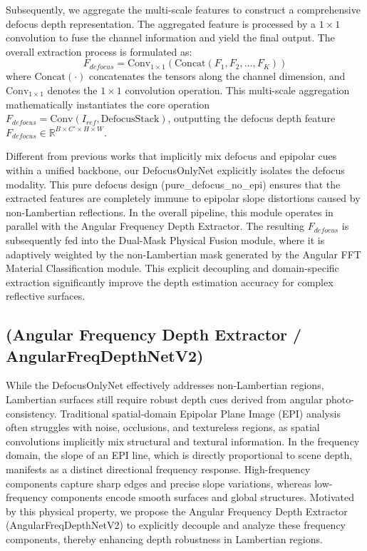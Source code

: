 Subsequently, we aggregate the multi-scale features to construct a comprehensive defocus depth representation. The aggregated feature is processed by a $1 \times 1$ convolution to fuse the channel information and yield the final output. The overall extraction process is formulated as:
\begin{equation}
\label{eq:eq19}
F_{defocus} = \text{Conv}_{1 \times 1}(\text{Concat}(F_1, F_2, \dots, F_K))
\end{equation}
where $\text{Concat}(\cdot)$ concatenates the tensors along the channel dimension, and $\text{Conv}_{1 \times 1}$ denotes the $1 \times 1$ convolution operation. This multi-scale aggregation mathematically instantiates the core operation $F_{defocus} = \text{Conv}(I_{ref}, \text{DefocusStack})$, outputting the defocus depth feature $F_{defocus} \in \mathbb{R}^{B \times C' \times H \times W}$.

Different from previous works that implicitly mix defocus and epipolar cues within a unified backbone, our DefocusOnlyNet explicitly isolates the defocus modality. This pure defocus design (pure_defocus_no_epi) ensures that the extracted features are completely immune to epipolar slope distortions caused by non-Lambertian reflections. In the overall pipeline, this module operates in parallel with the Angular Frequency Depth Extractor. The resulting $F_{defocus}$ is subsequently fed into the Dual-Mask Physical Fusion module, where it is adaptively weighted by the non-Lambertian mask generated by the Angular FFT Material Classification module. This explicit decoupling and domain-specific extraction significantly improve the depth estimation accuracy for complex reflective surfaces.

\subsection{(Angular Frequency Depth Extractor / AngularFreqDepthNetV2)}

While the DefocusOnlyNet effectively addresses non-Lambertian regions, Lambertian surfaces still require robust depth cues derived from angular photo-consistency. Traditional spatial-domain Epipolar Plane Image (EPI) analysis often struggles with noise, occlusions, and textureless regions, as spatial convolutions implicitly mix structural and textural information. In the frequency domain, the slope of an EPI line, which is directly proportional to scene depth, manifests as a distinct directional frequency response. High-frequency components capture sharp edges and precise slope variations, whereas low-frequency components encode smooth surfaces and global structures. Motivated by this physical property, we propose the Angular Frequency Depth Extractor (AngularFreqDepthNetV2) to explicitly decouple and analyze these frequency components, thereby enhancing depth robustness in Lambertian regions.

